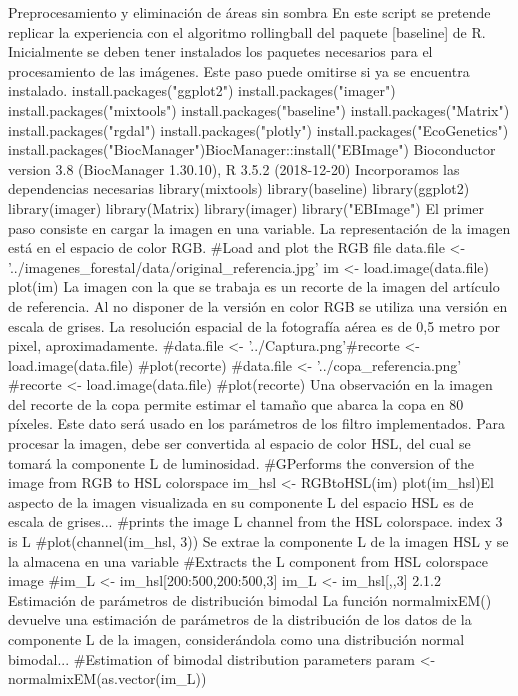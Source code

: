 Preprocesamiento y eliminación de áreas sin sombra
En este script se pretende replicar la experiencia con el algoritmo rollingball del paquete
[baseline] de R.
Inicialmente se deben tener instalados los paquetes necesarios para el procesamiento de
las imágenes.
Este paso puede omitirse si ya se encuentra instalado.
install.packages("ggplot2")
install.packages("imager")
install.packages("mixtools")
install.packages("baseline")
install.packages("Matrix")
install.packages("rgdal")
install.packages("plotly")
install.packages("EcoGenetics")
install.packages("BiocManager")BiocManager::install("EBImage")
Bioconductor version 3.8 (BiocManager 1.30.10), R 3.5.2 (2018-12-20)
Incorporamos las dependencias necesarias
library(mixtools)
library(baseline)
library(ggplot2)
library(imager)
library(Matrix)
library(imager)
library("EBImage")
El primer paso consiste en cargar la imagen en una variable. La representación de la
imagen está en el espacio de color RGB.
#Load and plot the RGB file
data.file <- '../imagenes_forestal/data/original_referencia.jpg'
im <- load.image(data.file)
plot(im)
La imagen con la que se trabaja es un recorte de la imagen del artículo de referencia. Al
no disponer de la versión en color RGB se utiliza  una versión en escala de grises.
La resolución espacial de la fotografía aérea es de 0,5 metro por pixel,
aproximadamente.
#data.file <- '../Captura.png'#recorte <- load.image(data.file)
#plot(recorte)
#data.file <- '../copa_referencia.png'
#recorte <- load.image(data.file)
#plot(recorte)
Una observación en la imagen del recorte de la copa permite estimar el tamaño que
abarca la copa en 80 píxeles. Este dato será usado en los parámetros de los filtro
implementados.
Para procesar la imagen, debe ser convertida al espacio de color  HSL, del cual se
tomará la componente L de luminosidad.
#GPerforms the conversion of the image from RGB to HSL colorspace
im_hsl <- RGBtoHSL(im)
plot(im_hsl)El aspecto de la imagen visualizada en su componente L del espacio HSL es de escala
de grises...
#prints the image L channel from the HSL colorspace. index 3 is L
#plot(channel(im_hsl, 3))
Se extrae la componente L de la imagen HSL y se la almacena en una variable
#Extracts the L component from HSL colorspace image
#im_L <- im_hsl[200:500,200:500,3]
im_L <- im_hsl[,,3]
2.1.2 Estimación de parámetros de distribución bimodal
La función normalmixEM() devuelve una estimación de parámetros de la distribución
de los datos de la componente L de la imagen, considerándola como una distribución
normal bimodal...
#Estimation of bimodal distribution parameters
param <- normalmixEM(as.vector(im_L))
